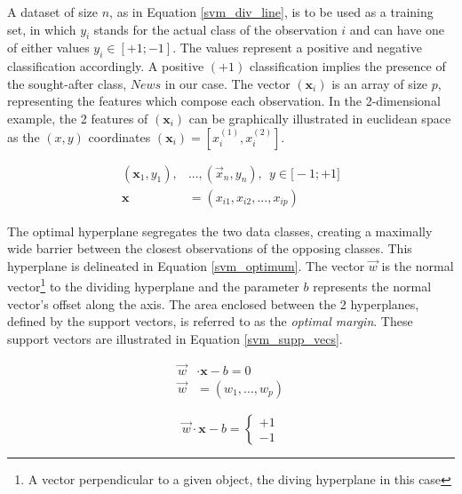 	 A dataset of size $n$, as in Equation \ref{svm_div_line}, is to be used as a training set, in which $y_i$ stands for the actual class of the observation $i$ and can have one of either values $y_i \in [+1;-1] $. The values represent a positive and negative classification accordingly. A positive $(+1)$ classification implies the presence of the sought-after class, $News$ in our case. The vector $(\textbf{x}_i)$ is an array of size $p$, representing the features which compose each observation. In the 2-dimensional example, the 2 features of $(\textbf{x}_i)$ can be graphically illustrated in euclidean space as the $(x,y)$ coordinates $(\textbf{x}_i) = [x_i^{(1)},x_i^{(2)}]$. 
	 
	\begin{equation}
		\begin{aligned}
			(\textbf{x}_1,y_1),& ... , (\vec{x}_n,y_n), \ \ y \in \big[-1;+1 \big] \\
			\textbf{x}& = (x_{i1},x_{i2}, ...,x_{ip})
		\end{aligned}
	\label{svm_div_line}
	\end{equation}
	
	The optimal hyperplane segregates the two data classes, creating a maximally wide barrier between the closest observations of the opposing classes. This hyperplane is delineated in Equation \ref{svm_optimum}. The vector $\vec{w}$ is the normal vector\footnote{A vector perpendicular to a given object, the diving hyperplane in this case} to the dividing hyperplane and the parameter $b$ represents the normal vector's offset along the axis. The area enclosed between the 2 hyperplanes, defined by the support vectors, is referred to as the \textit{optimal margin}. These support vectors are illustrated in Equation \ref{svm_supp_vecs}.
	
	\begin{equation}
		\begin{aligned}
			\vec{w}& \cdot \textbf{x} - b = 0 \\
			\vec{w}& = (w_1, ... , w_p) 
		\end{aligned}
		\label{svm_optimum}
	\end{equation}
	
	\begin{equation}
		\vec{w} \cdot \textbf{x} - b = 
		\begin{cases}
			+1 \\
			-1 
		\end{cases}
		\label{svm_supp_vecs}
	\end{equation}
	
